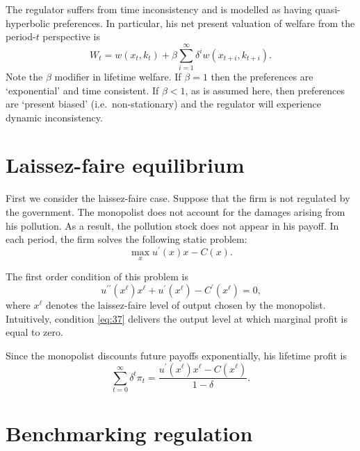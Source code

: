 The regulator suffers from time inconsistency and is modelled as having
quasi-hyperbolic preferences. In particular, his net present valuation of
welfare from the period-$t$ perspective is 
\begin{equation}
W_{t}=w(x_{t},k_{t})+\beta \sum_{i=1}^{\infty }\delta ^{i}w(x_{t+i},k_{t+i}).
\label{eq:35}
\end{equation}%
Note the $\beta $ modifier in lifetime welfare. If $\beta =1$ then the
preferences are `exponential' and time consistent. If $\beta <1$, as is
assumed here, then preferences are `present biased' (i.e.\ non-stationary)
and the regulator will experience dynamic inconsistency.

\section{Laissez-faire equilibrium}

\label{sec:laiss-faire-equil}

First we consider the laissez-faire case. Suppose that the firm is not
regulated by the government. The monopolist does not account for the damages
arising from his pollution. As a result, the pollution stock does not appear
in his payoff. In each period, the firm solves the following static problem: 
\begin{equation}
\max_{x}u^{\prime }(x)x-C(x).  \label{eq:36}
\end{equation}

The first order condition of this problem is 
\begin{equation}
u^{\prime \prime }(x^{\ell })x^{\ell }+u^{\prime }\left( x^{\ell }\right)
-C^{\prime }\left( x^{\ell }\right) =0\text{,}  \label{eq:37}
\end{equation}%
where $x^{\ell }$ denotes the laissez-faire level of output chosen by the
monopolist. Intuitively, condition \eqref{eq:37} delivers the output level
at which marginal profit is equal to zero.

Since the monopolist discounts future payoffs exponentially, his lifetime
profit is 
\begin{equation}
\sum_{t=0}^{\infty }\delta ^{t}\pi _{t}=\frac{u^{\prime }\left( x^{\ell
}\right) x^{\ell }-C\left( x^{\ell }\right) }{1-\delta }\text{.}
\label{eq:82}
\end{equation}

\section{Benchmarking regulation}

